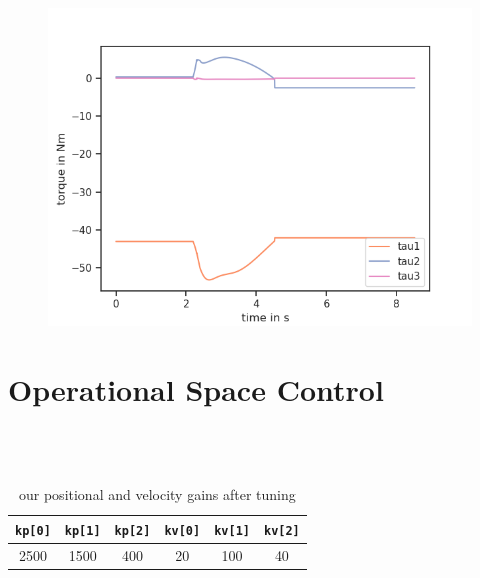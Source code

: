 \documentclass[a4paper,10pt]{article}
\begin{document}
\begin{figure}[H]
  \centering
  \includegraphics[scale=0.8]{img/B2_c_tau}
\end{figure}

\newpage

\section{Operational Space Control}

\setcounter{subsection}{2}
\subsection{~}

\begin{table}[h!]
  \begin{center}
    \begin{tabular}{c|c|c|c|c|c}
      \texttt{kp[0]} & \texttt{kp[1]} & \texttt{kp[2]} & \texttt{kv[0]} & \texttt{kv[1]} & \texttt{kv[2]}\\\hline
      2500 &1500 &400 &20 &100 &40 
    \end{tabular}
    \caption{our positional and velocity gains after tuning}
  \end{center}
\end{table}
\end{document}
